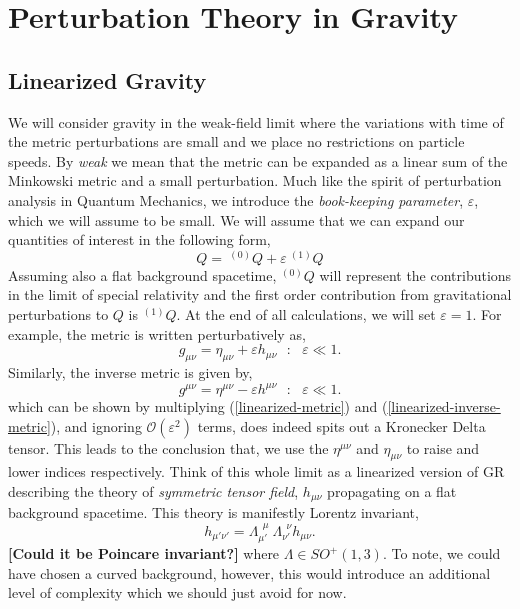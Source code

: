 \chapter{Perturbation Theory in Gravity}
\section{Linearized Gravity}
We will consider gravity in the weak-field limit where the variations with time of the metric perturbations are small and we place no restrictions on particle speeds. By \textit{weak} we mean that the metric can be expanded as a linear sum of the Minkowski metric and a small perturbation. Much like the spirit of perturbation analysis in Quantum Mechanics, we introduce the \textit{book-keeping parameter}, $\varepsilon$, which we will assume to be small. We will assume that we can expand our quantities of interest in the following form,
\begin{equation}
    Q =\ ^{(0)}Q + \varepsilon\ ^{(1)}Q 
\end{equation}
Assuming also a flat background spacetime, $^{(0)}Q$ will represent the contributions in the limit of special relativity and the first order contribution from gravitational perturbations to $Q$ is $^{(1)}Q$. At the end of all calculations, we will set $\varepsilon=1$. For example, the metric is written perturbatively as,
\begin{equation}\label{linearized-metric}
    g_{\mu\nu} = \eta_{\mu\nu} + \varepsilon h_{\mu\nu}\text{  $:$  } \varepsilon \ll 1. 
\end{equation}
Similarly, the inverse metric is given by, 
\begin{equation}\label{linearized-inverse-metric}
    g^{\mu\nu} = \eta^{\mu\nu} - \varepsilon h^{\mu\nu}\text{  $:$  } \varepsilon \ll 1.
\end{equation}
which can be shown by multiplying (\ref{linearized-metric}) and (\ref{linearized-inverse-metric}), and ignoring $\mathcal{O}(\varepsilon^2)$ terms, does indeed spits out a Kronecker Delta tensor. This leads to the conclusion that, we use the $\eta^{\mu\nu}$ and $\eta_{\mu\nu}$ to raise and lower indices respectively. Think of this whole limit as a linearized version of GR describing the theory of \textit{symmetric tensor field}, $h_{\mu\nu}$ propagating on a flat background spacetime. This theory is manifestly Lorentz invariant, 
\begin{equation}\nonumber
    h_{\mu'\nu'} = \Lambda_{\mu'}^{\ \  \mu}\ \Lambda_{\nu'}^{\ \ \nu}h_{\mu\nu}.
\end{equation}
\textbf{[Could it be Poincare invariant?]} where $\Lambda\in SO^{+}(1,3)$.
To note, we could have chosen a curved background, however, this would introduce an additional level of complexity which we should just avoid for now. 

